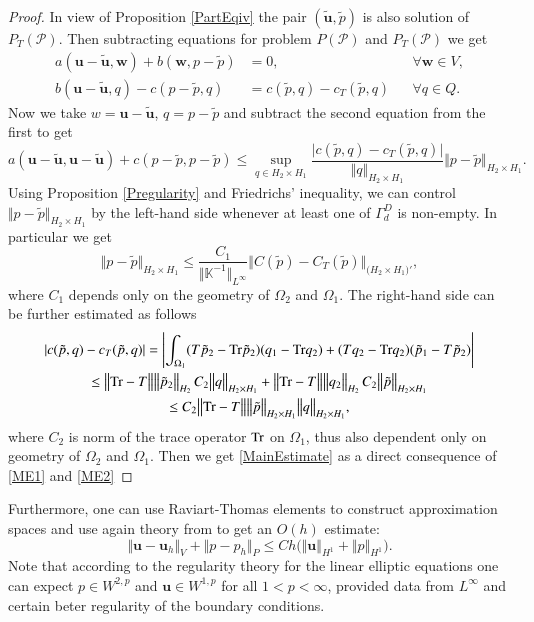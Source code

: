 \documentclass{elsarticle}
\def\Tr{{\rm Tr}}
\def\vc#1{\mathbf{\boldsymbol{#1}}}     %
\def\tn#1{{\mathbb{#1}}}    %
\def\abs#1{\lvert#1\rvert}
\def\norm#1{\bigl\Vert#1\bigr\Vert} %
\def\vl{{\vc{u}}}
\begin{document}
\begin{proof}
 In view of Proposition \ref{PartEqiv} the pair $(\tilde \vl, \tilde p)$ is also solution of $P_T(\mathcal P)$.
 Then subtracting equations for problem $P(\mathcal P)$ and $P_T(\mathcal P)$ we get
\begin{align}
 a(\vl-\tilde \vl,\vc w) + b(\vc w, p-\tilde p) &= 0, &&\forall \vc w\in V,\\
 b(\vl-\tilde \vl, q) - c(p-\tilde p,q) &= c(\tilde p,q)-c_T(\tilde p,q) &&\forall q \in Q.
\end{align}
Now we take $w=\vl-\tilde \vl$, $q=p-\tilde p$ and subtract the second equation from the first to get
\[
  a(\vl-\tilde \vl,\vl-\tilde\vl) +c(p-\tilde p, p-\tilde p) 
  \le \sup_{q\in H_2\times H_1} \frac{\abs{c(\tilde p,q)-c_T(\tilde p,q)}}{\norm{q}_{H_2\times H_1}} 
      \norm{p-\tilde p}_{H_2\times H_1}.
\]
Using Proposition \ref{Pregularity} and Friedrichs' inequality, we can control $\norm{p -\tilde p}_{H_2\times H_1}$
by the left-hand side whenever at least one of $\Gamma_d^D$ is non-empty. In particular we get
\begin{equation}\label{ME1}
  \norm{p-\tilde p}_{H_2\times H_1} \le \frac{C_1}{\norm{\tn K^{-1}}_{L^\infty}} 
  \norm{C(\tilde p)- C_T(\tilde p)}_{\big(H_2\times H_1\big)'},
\end{equation}
where $C_1$ depends only on the geometry of $\Omega_2$ and $\Omega_1$.
The right-hand side can be further estimated as follows
\begin{multline}\label{ME2}
 \abs{c(\tilde p,q)-c_T(\tilde p,q)} =
 \left\vert\int_{\Omega_1} (T\tilde p_2-\Tr\tilde p_2)(q_1-\Tr q_2)+(T q_2-\Tr q_2)(\tilde p_1 -T \tilde p_2)\right\vert\\
 \le \norm{\Tr-T}\norm{\tilde p_2}_{H_2}\,C_2\norm{q}_{H_2\times H_1} 
     + \norm{\Tr-T}\norm{q_2}_{H_2}\,C_2\norm{\tilde p}_{H_2\times H_1}\\
 \le C_2\norm{\Tr-T}\norm{\tilde p}_{H_2\times H_1}\norm{q}_{H_2\times H_1},
\end{multline}
where $C_2$ is norm of the trace operator $\Tr$ on $\Omega_1$, thus also dependent only on geometry of $\Omega_2$ and $\Omega_1$. Then we get \eqref{MainEstimate} as a direct consequence of \eqref{ME1} and \eqref{ME2} 
\end{proof}



Furthermore, one can use Raviart-Thomas elements to construct approximation spaces and use again theory
from \cite{Brezzi} to get an $O(h)$ estimate:
\begin{equation}\label{CompatibleConvergence}
 \norm{\vl-\vl_h}_{V} + \norm{p-p_h}_{P} \le C h\big(\norm{\vl}_{H^1} + \norm{p}_{H^1}\big).
\end{equation}
Note that according to the regularity theory for the linear elliptic equations one can expect $p\in W^{2,p}$ and $\vl\in W^{1,p}$ for all $1<p<\infty$, provided data from $L^\infty$ and certain beter regularity of the boundary conditions.
\end{document}
